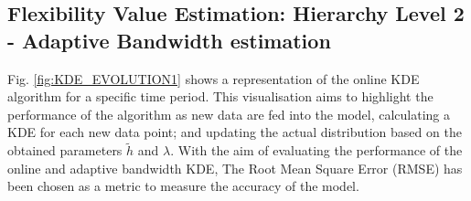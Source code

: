 
\begin{table}[htbp]
\centering
\caption{Results of model evaluation procedure for the climatology model in the first level of the hierarchy, using the Brier Score (BS) as a performance score.}
\vspace*{3mm}
\label{tab:level1-scores}
\end{table}

\subsection{Flexibility Value Estimation: Hierarchy Level 2 - Adaptive Bandwidth estimation}\label{Sect:ResultsLevel2AdaptiveBandwidth}
Fig. \ref{fig:KDE_EVOLUTION1} shows a representation of the online KDE algorithm for a specific time period. This visualisation aims to highlight the performance of the algorithm as new data are fed into the model, calculating a KDE for each new data point; and updating the actual distribution based on the obtained parameters $\widetilde{h}$ and $\lambda$. 
With the aim of evaluating the performance of the online and adaptive bandwidth KDE, The Root Mean Square Error (RMSE) has been chosen as a metric to measure the accuracy of the model.

